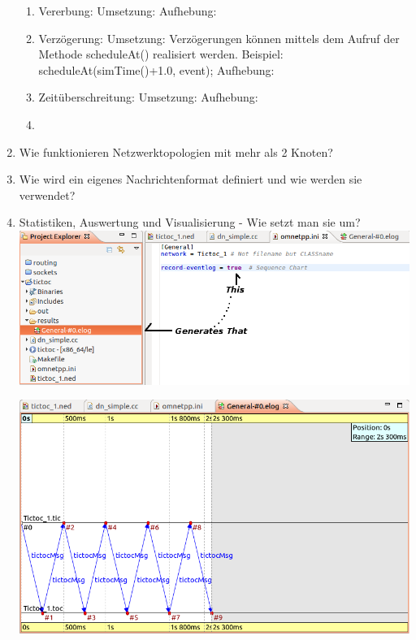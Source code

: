 \documentclass[11pt]{article}
\begin{document}
\begin{enumerate}[\thesubsection .1]
        \begin{enumerate}
            \item Vererbung:
            Umsetzung:
            Aufhebung:

            \item Verzögerung:
            Umsetzung:
            Verzögerungen können mittels dem Aufruf der Methode scheduleAt() realisiert werden.
            Beispiel:
            scheduleAt(simTime()+1.0, event);
            Aufhebung:

            \item Zeitüberschreitung:
            Umsetzung:
            Aufhebung:

            \item
        \end{enumerate}

        \item Wie funktionieren Netzwerktopologien mit mehr als 2 Knoten?\\


        \item Wie wird ein eigenes Nachrichtenformat definiert und wie werden sie verwendet?\\


        \item Statistiken, Auswertung und Visualisierung - Wie setzt man sie um?\\

        \includegraphics[width=\textwidth]{charting1.png}

        \includegraphics[width=\textwidth]{charting2.png}


    \end{enumerate}
\end{document}
